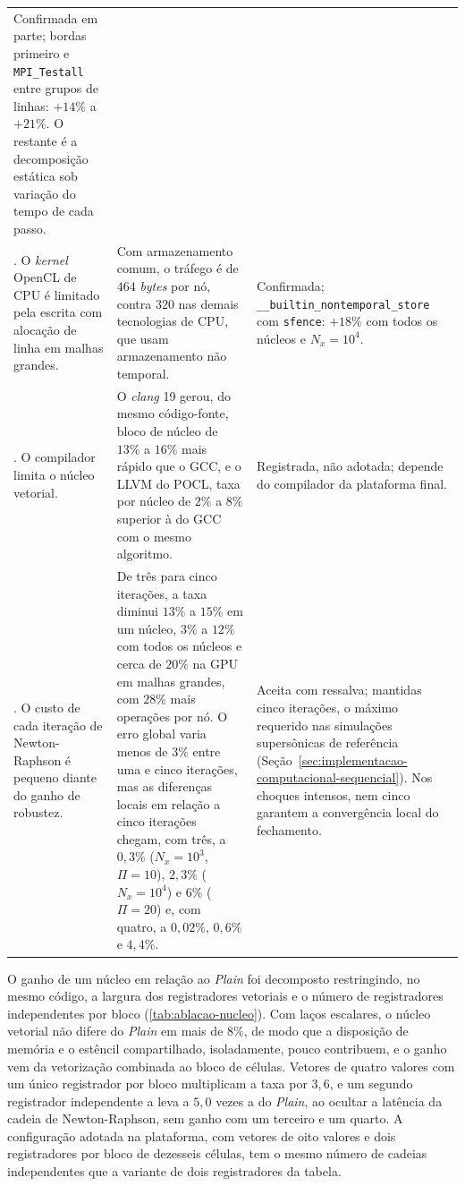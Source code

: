 \begin{longtable}{>{\raggedright\arraybackslash}p{3.2cm}>{\raggedright\arraybackslash}p{7.6cm}>{\raggedright\arraybackslash}p{4.3cm}}
        Confirmada em parte; bordas primeiro e \texttt{MPI\_Testall} entre grupos de linhas: $+14\%$ a $+21\%$. O restante é a decomposição estática sob variação do tempo de cada passo. \\
    18. O \textit{kernel} OpenCL de CPU é limitado pela escrita com alocação de linha em malhas grandes. &
        Com armazenamento comum, o tráfego é de $464$ \textit{bytes} por nó, contra $320$ nas demais tecnologias de CPU, que usam armazenamento não temporal. &
        Confirmada; \texttt{\_\_builtin\_\allowbreak nontemporal\_\allowbreak store} com \texttt{sfence}: $+18\%$ com todos os núcleos e $N_x = 10^4$. \\
    19. O compilador limita o núcleo vetorial. &
        O \textit{clang} 19 gerou, do mesmo código-fonte, bloco de núcleo de $13\%$ a $16\%$ mais rápido que o GCC, e o LLVM do POCL, taxa por núcleo de $2\%$ a $8\%$ superior à do GCC com o mesmo algoritmo. &
        Registrada, não adotada; depende do compilador da plataforma final. \\
    20. O custo de cada iteração de Newton-Raphson é pequeno diante do ganho de robustez. &
        De três para cinco iterações, a taxa diminui $13\%$ a $15\%$ em um núcleo, $3\%$ a $12\%$ com todos os núcleos e cerca de $20\%$ na GPU em malhas grandes, com $28\%$ mais operações por nó. O erro global varia menos de $3\%$ entre uma e cinco iterações, mas as diferenças locais em relação a cinco iterações chegam, com três, a $0{,}3\%$ ($N_x = 10^3$, $\Pi = 10$), $2{,}3\%$ ($N_x = 10^4$) e $6\%$ ($\Pi = 20$) e, com quatro, a $0{,}02\%$, $0{,}6\%$ e $4{,}4\%$. &
        Aceita com ressalva; mantidas cinco iterações, o máximo requerido nas simulações supersônicas de referência (Seção~\ref{sec:implementacao-computacional-sequencial}). Nos choques intensos, nem cinco garantem a convergência local do fechamento. \\
\end{longtable}
\endgroup

O ganho de um núcleo em relação ao \textit{Plain} foi decomposto restringindo, no mesmo código, a largura dos registradores vetoriais e o número de registradores independentes por bloco (\autoref{tab:ablacao-nucleo}).
Com laços escalares, o núcleo vetorial não difere do \textit{Plain} em mais de \(8\%\), de modo que a disposição de memória e o estêncil compartilhado, isoladamente, pouco contribuem, e o ganho vem da vetorização combinada ao bloco de células.
Vetores de quatro valores com um único registrador por bloco multiplicam a taxa por \(3{,}6\), e um segundo registrador independente a leva a \(5{,}0\) vezes a do \textit{Plain}, ao ocultar a latência da cadeia de Newton-Raphson, sem ganho com um terceiro e um quarto.
A configuração adotada na plataforma, com vetores de oito valores e dois registradores por bloco de dezesseis células, tem o mesmo número de cadeias independentes que a variante de dois registradores da tabela.

